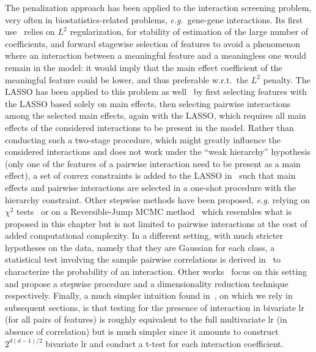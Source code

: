 The penalization approach has been applied to the interaction screening problem, very often in biostatistics-related problems, \textit{e.g.}\ gene-gene interactions. Its first use~\cite{park2007penalized} relies on $L^2$ regularization, for stability of estimation of the large number of coefficients, and forward stagewise selection of features to avoid a phenomenon where an interaction between a meaningful feature and a meaningless one would remain in the model: it would imply that the main effect coefficient of the meaningful feature could be lower, and thus preferable w.r.t.\ the $L^2$ penalty. The LASSO has been applied to this problem as well~\cite{wu2009genome} by first selecting features with the LASSO based solely on main effects, then selecting pairwise interactions among the selected main effects, again with the LASSO, which requires all main effects of the considered interactions to be present in the model. Rather than conducting such a two-stage procedure, which might greatly influence the considered interactions and does not work under the ``weak hierarchy'' hypothesis (only one of the features of a pairwise interaction need to be present as a main effect), a set of convex constraints is added to the LASSO in~\cite{bien2013lasso} such that main effects and pairwise interactions are selected in a one-shot procedure with the hierarchy constraint. Other stepwise methods have been proposed, \textit{e.g.} relying on $\chi^2$ tests~\cite{wang2012interaction} or on a Reversible-Jump MCMC method~\cite{kooperberg2005identifying,schwender2007identification} which resembles what is proposed in this chapter but is not limited to pairwise interactions at the cost of added computational complexity. In a different setting, with much stricter hypotheses on the data, namely that they are Gaussian for each class, a statistical test involving the sample pairwise correlations is derived in~\cite{simon} to characterize the probability of an interaction. Other works~\cite{fan2015innovated,li2018robust} focus on this setting and propose a stepwise procedure and a dimensionality reduction technique respectively. Finally, a much simpler intuition found in~\cite{berry2010testing}, on which we rely in subsequent sections, is that testing for the presence of interaction in bivariate \gls{lr} (for all pairs of features) is roughly equivalent to the full multivariate \gls{lr} (in absence of correlation) but is much simpler since it amounts to construct $2^{d(d-1)/2}$ bivariate \gls{lr} and conduct a t-test for each interaction coefficient.

